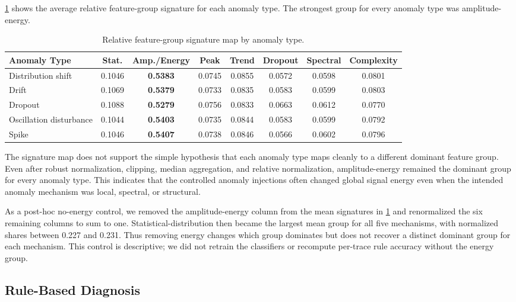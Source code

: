\cref{tab:signature-map} shows the average relative feature-group signature for each anomaly type. The strongest group for every anomaly type was amplitude-energy.

\begin{table}[htbp]
\centering
\caption{Relative feature-group signature map by anomaly type.}
\label{tab:signature-map}
\begin{tabular}{lccccccc}
\toprule
\textbf{Anomaly Type} & \textbf{Stat.} & \textbf{Amp./Energy} & \textbf{Peak} & \textbf{Trend} & \textbf{Dropout} & \textbf{Spectral} & \textbf{Complexity} \\
\midrule
Distribution shift & 0.1046 & \textbf{0.5383} & 0.0745 & 0.0855 & 0.0572 & 0.0598 & 0.0801 \\
Drift & 0.1069 & \textbf{0.5379} & 0.0733 & 0.0835 & 0.0583 & 0.0599 & 0.0803 \\
Dropout & 0.1088 & \textbf{0.5279} & 0.0756 & 0.0833 & 0.0663 & 0.0612 & 0.0770 \\
Oscillation disturbance & 0.1044 & \textbf{0.5403} & 0.0735 & 0.0844 & 0.0583 & 0.0599 & 0.0792 \\
Spike & 0.1046 & \textbf{0.5407} & 0.0738 & 0.0846 & 0.0566 & 0.0602 & 0.0796 \\
\bottomrule
\end{tabular}
\end{table}

The signature map does not support the simple hypothesis that each anomaly type maps cleanly to a different dominant feature group. Even after robust normalization, clipping, median aggregation, and relative normalization, amplitude-energy remained the dominant group for every anomaly type. This indicates that the controlled anomaly injections often changed global signal energy even when the intended anomaly mechanism was local, spectral, or structural.

As a post-hoc no-energy control, we removed the amplitude-energy column from the mean signatures in \cref{tab:signature-map} and renormalized the six remaining columns to sum to one. Statistical-distribution then became the largest mean group for all five mechanisms, with normalized shares between 0.227 and 0.231. Thus removing energy changes which group dominates but does not recover a distinct dominant group for each mechanism. This control is descriptive; we did not retrain the classifiers or recompute per-trace rule accuracy without the energy group.

\subsection{Rule-Based Diagnosis}

